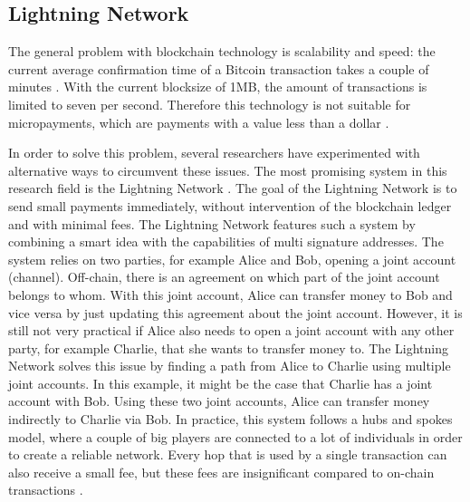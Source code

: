 \subsection{Lightning Network}
\label{sec:lightning}
The general problem with blockchain technology is scalability and speed: the current average confirmation time of a Bitcoin transaction takes a couple of minutes \cite{bamert2013have}. With the current blocksize of 1MB, the amount of transactions is limited to seven per second. Therefore this technology is not suitable for micropayments, which are payments with a value less than a dollar \cite{definitionmicropayment}.

In order to solve this problem, several researchers have experimented with alternative ways to circumvent these issues. The most promising system in this research field is the Lightning Network \cite{poon2016bitcoin}. The goal of the Lightning Network is to send small payments immediately, without intervention of the blockchain ledger and with minimal fees. The Lightning Network features such a system by combining a smart idea with the capabilities of multi signature addresses. The system relies on two parties, for example Alice and Bob, opening a joint account (channel). Off-chain, there is an agreement on which part of the joint account belongs to whom. With this joint account, Alice can transfer money to Bob and vice versa by just updating this agreement about the joint account. However, it is still not very practical if Alice also needs to open a joint account with any other party, for example Charlie, that she wants to transfer money to. The Lightning Network solves this issue by finding a path from Alice to Charlie using multiple joint accounts. In this example, it might be the case that Charlie has a joint account with Bob. Using these two joint accounts, Alice can transfer money indirectly to Charlie via Bob. In practice, this system follows a hubs and spokes model, where a couple of big players are connected to a lot of individuals in order to create a reliable network. Every hop that is used by a single transaction can also receive a small fee, but these fees are insignificant compared to on-chain transactions \cite{poon2016bitcoin}.

